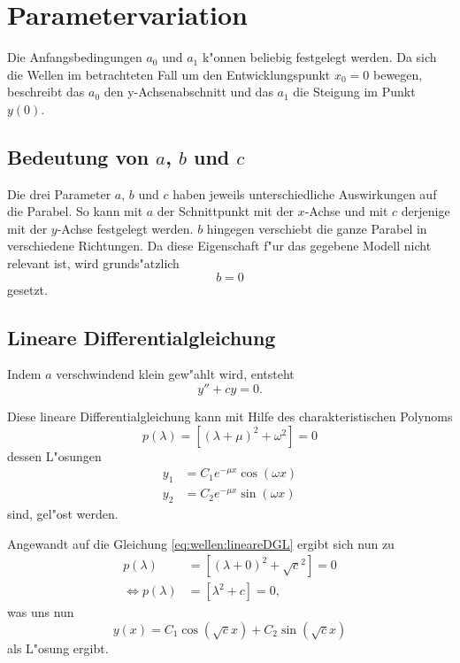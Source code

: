\section{Parametervariation}
\label{sec:wellen:parametervariation}

Die Anfangsbedingungen $a_0$ und $a_1$ k"onnen beliebig festgelegt werden. Da 
sich die Wellen im betrachteten Fall um den Entwicklungspunkt $x_0=0$ bewegen, 
beschreibt das $a_0$ den y-Achsenabschnitt und das $a_1$ die Steigung im Punkt 
$y(0)$.

\subsection{Bedeutung von \texorpdfstring{$a$}{a}, \texorpdfstring{$b$}{b} und 
\texorpdfstring{$c$}{c}}
Die drei Parameter $a$, $b$ und $c$ haben jeweils unterschiedliche Auswirkungen 
auf die Parabel. So kann mit $a$ der Schnittpunkt mit der $x$-Achse und mit $c$ 
derjenige mit der $y$-Achse festgelegt werden. $b$ hingegen verschiebt die 
ganze Parabel in verschiedene Richtungen. Da diese Eigenschaft f"ur das 
gegebene Modell nicht relevant ist, wird grunds"atzlich
\begin{equation*}
	b = 0
\end{equation*}
gesetzt.

\subsection{Lineare Differentialgleichung}
\label{subsec:wellen:linearedifferntialgleichung}

Indem $a$ verschwindend klein gew"ahlt wird, entsteht
\begin{equation}
	y''+ cy = 0.
	\label{eq:wellen:lineareDGL}
\end{equation}

Diese lineare Differentialgleichung kann mit Hilfe des charakteristischen 
Polynoms
\begin{equation*}
	p(\lambda) = [(\lambda+\mu)^2+\omega^2] = 0
\end{equation*}
dessen L"osungen
\begin{equation*}
\begin{split}
	y_1 &= C_1e^{-\mu x}\cos(\omega x) \\
	y_2 &= C_2e^{-\mu x}\sin(\omega x)
\end{split}
\end{equation*}
sind, gel"ost werden.

Angewandt auf die Gleichung \ref{eq:wellen:lineareDGL} ergibt sich nun zu
\begin{equation*}
\begin{split}
	p(\lambda) &= [(\lambda+0)^2+\sqrt{c}^2] = 0 \\
	\Leftrightarrow p(\lambda) &= [\lambda^2+c] = 0,
\end{split}
\end{equation*}
was uns nun
\begin{equation}
y(x) = C_1 \cos(\sqrt{c}x) + C_2 \sin(\sqrt{c}x)
\label{eq:wellen:loesunglinearedgl}
\end{equation}
als L"osung ergibt.


